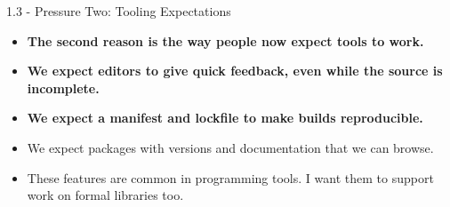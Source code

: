 \documentclass[aspectratio=169,11pt]{beamer}
\begin{document}
\begin{frame}[fragile,t]{1.3 - Pressure Two: Tooling Expectations}
\begin{itemize}
\setlength{\itemsep}{1pt}
\setlength{\parsep}{0pt}
\setlength{\parskip}{0pt}
\item \textcolor{blue!55!black}{\textbf{The second reason is the way people now expect tools to work.}}
\item \textcolor{blue!55!black}{\textbf{We expect editors to give quick feedback, even while the source is incomplete.}}
\item \textcolor{blue!55!black}{\textbf{We expect a manifest and lockfile to make builds reproducible.}}
\item We expect packages with versions and documentation that we can browse.
\item These features are common in programming tools. I want them to support work on formal libraries too.
\end{itemize}
\end{frame}
\end{document}
